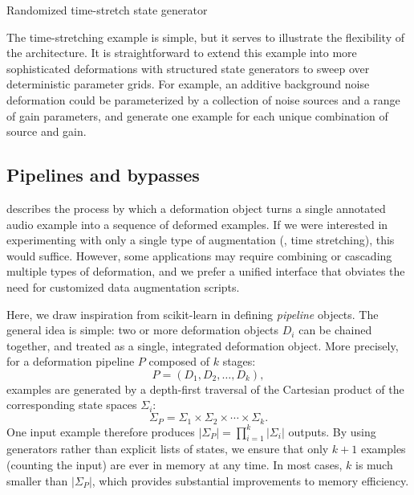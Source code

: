 \documentclass{article}
\begin{document}
\begin{algorithm}[t]
    \caption{Randomized time-stretch state generator\label{alg:timestate}}
    \begin{algorithmic}[1]
            \EndFor{}
        \EndFunction{}
    \end{algorithmic}
\end{algorithm}

The time-stretching example is simple, but it serves to illustrate the flexibility of 
the architecture.
It is straightforward to extend this example into more sophisticated deformations 
with structured state generators to sweep over deterministic parameter grids.
For example, an additive background noise deformation could be parameterized by 
a collection of noise sources and a range of gain parameters, and 
generate one example for each unique combination of source and gain.

\subsection{Pipelines and bypasses}
 describes the process by which a deformation object turns a
single annotated audio example into a sequence of deformed examples.  If we were
interested in experimenting with only a single type of augmentation (\eg, time stretching),
this would suffice.  However, some applications may require combining or cascading
multiple types of deformation, and we prefer a unified interface that obviates the
need for customized data augmentation scripts.

Here, we draw inspiration from scikit-learn in defining \emph{pipeline}
objects.  The general idea is simple: two or more deformation objects $D_i$ can be chained
together, and treated as a single, integrated deformation object.  
More precisely, for a deformation pipeline $P$ composed of $k$ stages:
\[
P = (D_1, D_2, \dots, D_k),
\]examples are generated by a depth-first traversal of the
Cartesian product of the corresponding state spaces $\Sigma_i$:
\[
\Sigma_P = \Sigma_1 \times \Sigma_2 \times \cdots \times \Sigma_k.
\]
One input example therefore produces $|\Sigma_P|=\prod_{i=1}^k |\Sigma_i|$ outputs.
By using generators rather than explicit lists of states, 
we ensure that only $k+1$ examples (counting the input) are ever in memory at any time.
In most cases, $k$ is much smaller than $|\Sigma_P|$, which provides substantial
improvements to memory efficiency.
\end{document}
